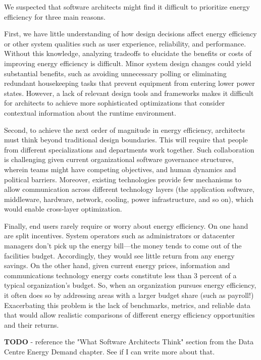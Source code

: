 We suspected that software architects might find it difficult to prioritize energy efficiency for three main reasons. 

First, we have little understanding of how design decisions affect energy efficiency or other system qualities such as user experience, reliability, and performance. Without this knowledge, analyzing tradeoffs to elucidate the benefits or costs of improving energy efficiency is difficult. Minor system design changes could yield substantial benefits, such as avoiding unnecessary polling or eliminating redundant housekeeping tasks that prevent equipment from entering lower power states. However, a lack of relevant design tools and frameworks makes it difficult for architects to achieve more sophisticated optimizations that consider contextual information about the runtime environment.

Second, to achieve the next order of magnitude in energy efficiency, architects must think beyond traditional design boundaries. This will require that people from different specializations and departments work together. Such collaboration is challenging given current organizational software governance structures, wherein teams might have competing objectives, and human dynamics and political barriers. Moreover, existing technologies provide few mechanisms to allow communication across different technology layers (the application software, middleware, hardware, network, cooling, power infrastructure, and so on), which would enable cross-layer optimization.

Finally, end users rarely require or worry about energy efficiency. On one hand are split incentives. System operators such as administrators or datacenter managers don’t pick up the energy bill—the money tends to come out of the facilities budget. Accordingly, they would see little return from any energy savings. On the other hand, given current energy prices, information and communications technology energy costs constitute less than 3 percent of a typical organization’s budget. So, when an organization pursues energy efficiency, it often does so by addressing areas with a larger budget share (such as payroll!) Exacerbating this problem is the lack of benchmarks, metrics, and reliable data that would allow realistic comparisons of different energy efficiency opportunities and their returns.

\textbf{TODO} - reference the "What Software Architects Think" section from the Data Centre Energy Demand chapter.  See if I can write more about that.

